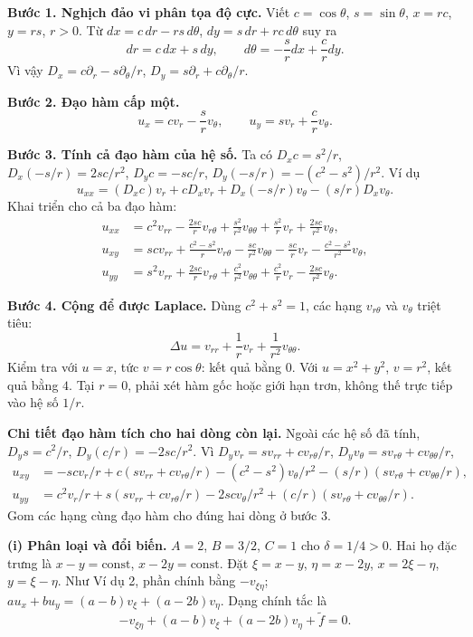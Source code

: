 \textbf{Bước 1. Nghịch đảo vi phân tọa độ cực.} Viết $c=\cos\theta$, $s=\sin\theta$, $x=rc$, $y=rs$, $r>0$. Từ $dx=c\,dr-rs\,d\theta$, $dy=s\,dr+rc\,d\theta$ suy ra
\[dr=c\,dx+s\,dy,\qquad d\theta=-\frac{s}{r}dx+\frac{c}{r}dy.\]
Vì vậy $D_x=c\partial_r-s\partial_\theta/r$, $D_y=s\partial_r+c\partial_\theta/r$.

\textbf{Bước 2. Đạo hàm cấp một.}
\[u_x=cv_r-\frac{s}{r}v_\theta,\qquad u_y=sv_r+\frac{c}{r}v_\theta.\]

\textbf{Bước 3. Tính cả đạo hàm của hệ số.} Ta có $D_xc=s^2/r$, $D_x(-s/r)=2sc/r^2$, $D_yc=-sc/r$, $D_y(-s/r)=-(c^2-s^2)/r^2$. Ví dụ
\[u_{xx}=(D_xc)v_r+cD_xv_r+D_x(-s/r)v_\theta-(s/r)D_xv_\theta.\]
Khai triển cho cả ba đạo hàm:
\begin{align*}
u_{xx}&=c^2v_{rr}-\frac{2sc}{r}v_{r\theta}+\frac{s^2}{r^2}v_{\theta\theta}
+\frac{s^2}{r}v_r+\frac{2sc}{r^2}v_\theta,\\
u_{xy}&=scv_{rr}+\frac{c^2-s^2}{r}v_{r\theta}-\frac{sc}{r^2}v_{\theta\theta}
-\frac{sc}{r}v_r-\frac{c^2-s^2}{r^2}v_\theta,\\
u_{yy}&=s^2v_{rr}+\frac{2sc}{r}v_{r\theta}+\frac{c^2}{r^2}v_{\theta\theta}
+\frac{c^2}{r}v_r-\frac{2sc}{r^2}v_\theta.
\end{align*}

\textbf{Bước 4. Cộng để được Laplace.} Dùng $c^2+s^2=1$, các hạng $v_{r\theta}$ và $v_\theta$ triệt tiêu:
\[\boxed{\Delta u=v_{rr}+\frac1r v_r+\frac1{r^2}v_{\theta\theta}.}\]
Kiểm tra với $u=x$, tức $v=r\cos\theta$: kết quả bằng $0$. Với $u=x^2+y^2$, $v=r^2$, kết quả bằng $4$. Tại $r=0$, phải xét hàm gốc hoặc giới hạn trơn, không thế trực tiếp vào hệ số $1/r$.

\textbf{Chi tiết đạo hàm tích cho hai dòng còn lại.} Ngoài các hệ số đã tính, $D_ys=c^2/r$, $D_y(c/r)=-2sc/r^2$. Vì $D_yv_r=sv_{rr}+cv_{r\theta}/r$, $D_yv_\theta=sv_{r\theta}+cv_{\theta\theta}/r$,
\[\begin{aligned}
u_{xy}&=-scv_r/r+c(sv_{rr}+cv_{r\theta}/r)
-(c^2-s^2)v_\theta/r^2-(s/r)(sv_{r\theta}+cv_{\theta\theta}/r),\\
u_{yy}&=c^2v_r/r+s(sv_{rr}+cv_{r\theta}/r)
-2scv_\theta/r^2+(c/r)(sv_{r\theta}+cv_{\theta\theta}/r).
\end{aligned}\]
Gom các hạng cùng đạo hàm cho đúng hai dòng ở bước 3.

\textbf{(i) Phân loại và đổi biến.} $A=2$, $B=3/2$, $C=1$ cho $\delta=1/4>0$. Hai họ đặc trưng là $x-y=\mathrm{const}$, $x-2y=\mathrm{const}$. Đặt $\xi=x-y$, $\eta=x-2y$, $x=2\xi-\eta$, $y=\xi-\eta$. Như Ví dụ 2, phần chính bằng $-v_{\xi\eta}$; $au_x+bu_y=(a-b)v_\xi+(a-2b)v_\eta$. Dạng chính tắc là
\[-v_{\xi\eta}+(a-b)v_\xi+(a-2b)v_\eta+\widetilde f=0.\]

